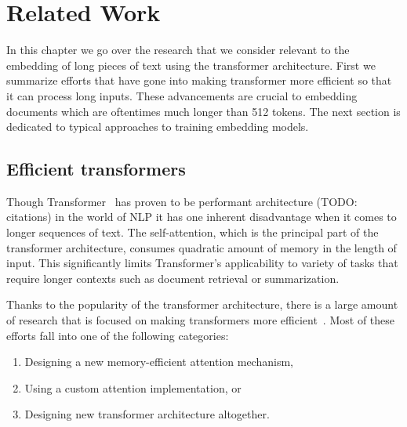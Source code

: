 \chapter{Related Work}


In this chapter we go over the research that we consider relevant to the
embedding of long pieces of text using the transformer architecture. First we
summarize efforts that have gone into making transformer more efficient so that
it can process long inputs. These advancements are crucial to embedding
documents which are oftentimes much longer than 512 tokens. The next section is
dedicated to typical approaches to training embedding models.

\section{Efficient transformers}\label{section:efficient_transformers}


Though Transformer~\citep{vaswani2017attention} has proven to be performant
architecture (TODO: citations) in the world of NLP it has one inherent
disadvantage when it comes to longer sequences of text. The self-attention,
which is the principal part of the transformer architecture, consumes quadratic
amount of memory in the length of input. This significantly limits Transformer's
applicability to variety of tasks that require longer contexts such as document
retrieval or summarization.

Thanks to the popularity of the transformer architecture, there is a large
amount of research that is focused on making transformers more
efficient~\citep{tay2022efficient}. Most of these efforts fall into one of the
following categories:

\begin{enumerate}

    \item Designing a new memory-efficient attention mechanism,

    \item Using a custom attention implementation, or

    \item Designing new transformer architecture altogether.

\end{enumerate}

